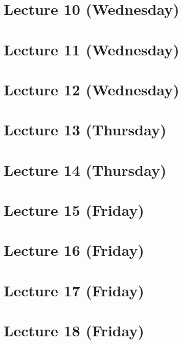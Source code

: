 \documentclass[12pt]{amsart}
\begin{document}
\section{Lecture 10 (Wednesday)}


\section{Lecture 11 (Wednesday)}


\section{Lecture 12 (Wednesday)}


\section{Lecture 13 (Thursday)}


\section{Lecture 14 (Thursday)}


\section{Lecture 15 (Friday)}


\section{Lecture 16 (Friday)}
% 

\section{Lecture 17 (Friday)}
% 

\section{Lecture 18 (Friday)}

\end{document}
